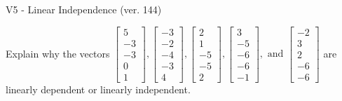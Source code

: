 \begin{exercise}
  \begin{exerciseTitle}V5 - Linear Independence (ver. 144)\end{exerciseTitle}
  \begin{exerciseStatement}
    Explain why the vectors \(\left[\begin{array}{r}
5 \\
-3 \\
-3 \\
0 \\
1
\end{array}\right] , \left[\begin{array}{r}
-3 \\
-2 \\
-4 \\
-3 \\
4
\end{array}\right] , \left[\begin{array}{r}
2 \\
1 \\
-5 \\
-5 \\
2
\end{array}\right] , \left[\begin{array}{r}
3 \\
-5 \\
-6 \\
-6 \\
-1
\end{array}\right] , \text{ and } \left[\begin{array}{r}
-2 \\
3 \\
2 \\
-6 \\
-6
\end{array}\right]\) are linearly dependent or linearly independent.	



\end{exerciseStatement}
\end{exercise}
